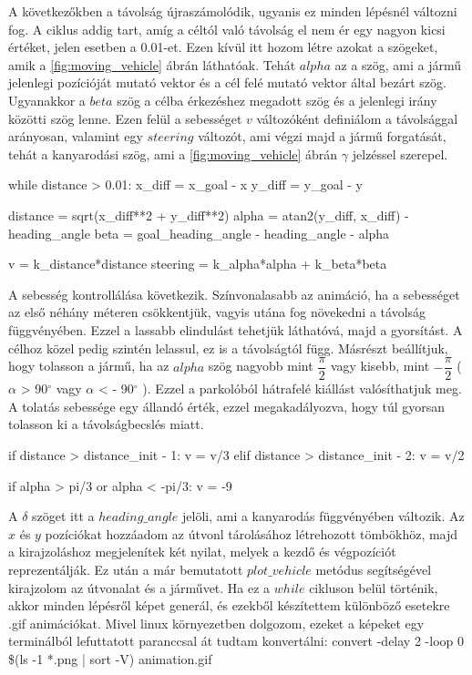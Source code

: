 \bigskip

A következőkben a távolság újraszámolódik, ugyanis ez minden lépésnél változni fog. A ciklus addig tart, amíg a céltól való távolság el nem ér egy nagyon kicsi értéket, jelen esetben a 0.01-et. Ezen kívül itt hozom létre azokat a szögeket, amik a \ref{fig:moving_vehicle} ábrán láthatóak. Tehát $ alpha $ az a szög, ami a jármű jelenlegi pozícióját mutató vektor és a cél felé mutató vektor által bezárt szög. Ugyanakkor a $ beta $ szög a célba érkezéshez megadott szög és a jelenlegi irány közötti szög lenne. Ezen felül a sebességet $ v $ változóként definiálom a távolsággal arányosan, valamint egy $ steering $ változót, ami végzi majd a jármű forgatását, tehát a kanyarodási szög, ami a \ref{fig:moving_vehicle} ábrán $ \gamma $ jelzéssel szerepel.

\begin{python}
while distance > 0.01:
        x_diff = x_goal - x
        y_diff = y_goal - y

        distance = sqrt(x_diff**2 + y_diff**2)
        alpha = atan2(y_diff, x_diff) - heading_angle
        beta = goal_heading_angle - heading_angle - alpha

        v = k_distance*distance
        steering = k_alpha*alpha + k_beta*beta
\end{python}

\bigskip

A sebesség kontrollálása következik. Színvonalasabb az animáció, ha a sebességet az első néhány méteren csökkentjük, vagyis utána fog növekedni a távolság függvényében. Ezzel a lassabb elindulást tehetjük láthatóvá, majd a gyorsítást. A célhoz közel pedig szintén lelassul, ez is a távolságtól függ. Másrészt beállítjuk, hogy tolasson a jármű, ha az $ alpha $ szög nagyobb mint $ \dfrac{\pi}{2} $ vagy kisebb, mint $ -\dfrac{\pi}{2} $ ( $ \alpha $ > 90$^{\circ}$ vagy $ \alpha $ < - 90$^{\circ}$ ). Ezzel a parkolóból hátrafelé kiállást valósíthatjuk meg. A tolatás sebessége egy állandó érték, ezzel megakadályozva, hogy túl gyorsan tolasson ki a távolságbecslés miatt.

\begin{python}
        if distance > distance_init - 1:
            v = v/3
        elif distance > distance_init - 2:
            v = v/2

        if alpha > pi/3 or alpha < -pi/3:
            v = -9
\end{python}

\bigskip

A $ \delta $ szöget itt a $ heading\_angle $ jelöli, ami a kanyarodás függvényében változik. Az $ x $ és $ y $ pozíciókat  hozzáadom az útvonl tárolásához létrehozott tömbökhöz, majd a kirajzoláshoz megjelenítek két nyilat, melyek a kezdő és végpozíciót reprezentálják. Ez után a már bemutatott $ plot\_vehicle $ metódus segítségével kirajzolom az útvonalat és a járművet. Ha ez a $ while $ cikluson belül történik, akkor minden lépésről képet generál, és ezekből készítettem különböző esetekre .gif animációkat. Mivel linux környezetben dolgozom, ezeket a képeket egy terminálból lefuttatott paranccsal át tudtam konvertálni: convert -delay 2 -loop 0 \$(ls -1 *.png | sort -V) animation.gif

